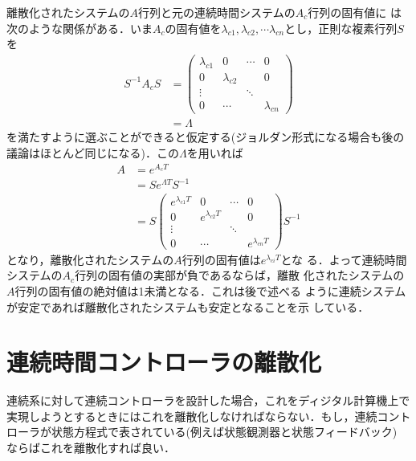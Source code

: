 離散化されたシステムの$A$行列と元の連続時間システムの$A_c$行列の固有値に
は次のような関係がある．いま$A_c$の固有値を$\lambda_{c1}, \lambda_{c2},
\cdots \lambda_{cn}$とし，正則な複素行列$S$を
\begin{align}
 S^{-1} A_c S 
  &=
  \left(\begin{array}{cccc}
         \lambda_{c1} & 0            & \cdots & 0 \\
	 0            & \lambda_{c2} &        & 0 \\
	 \vdots       &              & \ddots & \\
	 0            & \cdots       &        & \lambda_{cn} 
	\end{array}\right) \nonumber \\
 &= \Lambda
\end{align}
を満たすように選ぶことができると仮定する(ジョルダン形式になる場合も後の
議論はほとんど同じになる)．この$\Lambda$を用いれば
\begin{align}
 A &=  e^{A_cT} \nonumber \\
 &= S e^{\Lambda T} S^{-1} \nonumber \\
 &=
  S \left(\begin{array}{cccc}
           e^{\lambda_{c1} T} & 0                  & \cdots & 0 \\
	   0                  & e^{\lambda_{c2} T} &        & 0 \\
	   \vdots             &                    & \ddots & \\
	   0                  & \cdots             & & e^{\lambda_{cn} T}
	  \end{array}\right)
  S^{-1}
\end{align}
となり，離散化されたシステムの$A$行列の固有値は$e^{\lambda_{ci} T}$とな
る．よって連続時間システムの$A_c$行列の固有値の実部が負であるならば，離散
化されたシステムの$A$行列の固有値の絶対値は1未満となる．これは後で述べる
ように連続システムが安定であれば離散化されたシステムも安定となることを示
している．

\section{連続時間コントローラの離散化}
連続系に対して連続コントローラを設計した場合，これをディジタル計算機上で
実現しようとするときにはこれを離散化しなければならない．もし，連続コント
ローラが状態方程式で表されている(例えば状態観測器と状態フィードバック)
ならばこれを離散化すれば良い．

